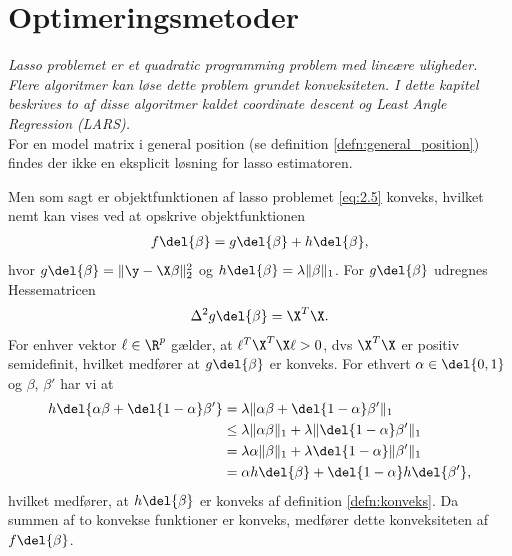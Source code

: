\chapter{Optimeringsmetoder} \label{kap:optimeringsmetoder}
\textit{Lasso problemet er et quadratic programming problem med lineære uligheder. 
Flere algoritmer kan løse dette problem grundet konveksiteten.  
I dette kapitel beskrives to af disse algoritmer kaldet coordinate descent og Least Angle Regression (LARS).} \\[4mm]
%
For en model matrix i general position (se definition \ref{defn:general_position}) findes der ikke en eksplicit løsning for lasso estimatoren.

Men som sagt er objektfunktionen af lasso problemet \eqref{eq:2.5} konveks, hvilket nemt kan vises ved at opskrive objektfunktionen
\begin{align}
f \del{\beta} = g \del{\beta} + h \del{\beta}, \label{eq:opdeling_fkt}
\end{align}
hvor \(g \del{\beta} =\Vert \y - \X \beta \Vert_2^2\) og \(h \del{\beta} = \lambda \Vert \beta \Vert_1\).
For \(g \del{\beta}\) udregnes Hessematricen
\begin{align*}
\Delta^2 g \del{\beta} = \X^T \X.
\end{align*} 
For enhver vektor \(\ell \in \R^p\) gælder, at \(\ell^T \X^T \X \ell > 0\), dvs \( \X^T \X \) er positiv semidefinit, hvilket medfører at \(g \del{\beta}\) er konveks.
For ethvert \(\alpha \in \del{0,1}\) og \(\beta\), \(\beta'\) har vi at
\begin{align*}
h \del{\alpha \beta + \del{1-\alpha}\beta'} &= \lambda \Vert \alpha \beta + \del{1-\alpha} \beta' \Vert_1 \\
&\leq \lambda \Vert \alpha \beta \Vert_1 + \lambda \Vert \del{1-\alpha} \beta' \Vert_1 \\
&= \lambda \alpha \Vert \beta \Vert_1 + \lambda \del{1-\alpha} \Vert \beta' \Vert_1 \\
&= \alpha h \del{\beta} + \del{1-\alpha} h \del{\beta'},
\end{align*}
hvilket medfører, at \(h \del{\beta}\) er konveks af definition \ref{defn:konveks}.
Da summen af to konvekse funktioner er konveks, medfører dette konveksiteten af \(f \del{\beta}\). 

